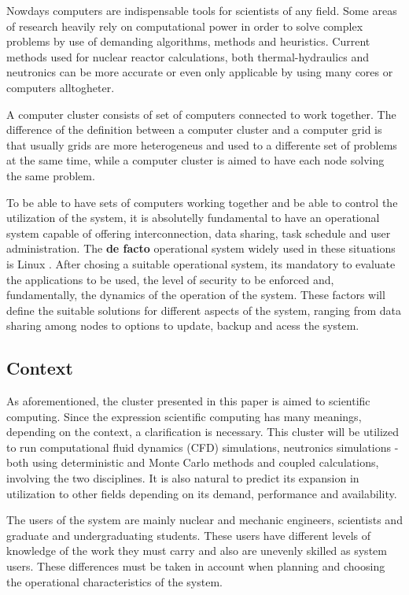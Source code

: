 \documentclass[twoside,a4paper,12pt,english]{inac17}
\begin{document}
Nowdays computers are indispensable tools for scientists of any field.
Some areas of research heavily rely on computational power in order to solve
complex problems by use of demanding algorithms, methods and heuristics.
Current methods used for nuclear reactor calculations, both thermal-hydraulics
and neutronics can be more accurate or even only applicable by using
many cores or computers alltogheter.

A computer cluster consists of set of computers connected to work together. The difference of the
definition between a computer cluster and a computer grid is that usually grids are more
heterogeneus and used to a differente set of problems at the same time, while a computer
cluster is aimed to have each node solving the same problem.

To be able to have sets of computers working together and be able to control the utilization of the system,
it is absolutelly fundamental to have an operational system capable of offering interconnection, data sharing,
task schedule and user administration. The \textbf{de facto} operational system widely used in these situations
is Linux \cite{Linux}. After chosing a suitable operational system, its mandatory to evaluate the applications to
be used, the level of security to be enforced and, fundamentally, the dynamics of the operation of the system.
These factors will define the suitable solutions for different aspects of the system, ranging from data
sharing among nodes to options to update, backup and acess the system.



\subsection{Context}

As aforementioned, the cluster presented in this paper is aimed to scientific computing.
Since the expression scientific computing has many meanings, depending on the context, a
clarification is necessary. This cluster will be utilized to run computational fluid dynamics
(CFD) simulations, neutronics simulations - both using deterministic and Monte Carlo \cite{MC}
methods and coupled calculations, involving the two disciplines. It is also natural to predict
its expansion in utilization to other fields depending on its demand, performance and availability.

The users of the system are mainly nuclear and mechanic engineers, scientists and graduate
and undergraduating students. These users have different levels of knowledge of the work
they must carry and also are unevenly skilled as system users. These differences must be taken
in account when planning and choosing the operational characteristics of the system.
\end{document}
